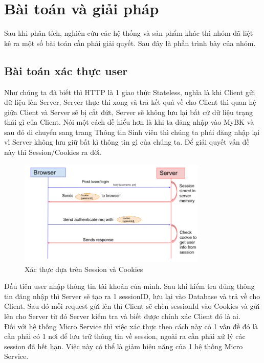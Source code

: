 \chapter{Bài toán và giải pháp}\label{chap:ProblemAndSolve}
		Sau khi phân tích, nghiên cứu các hệ thống và sản phẩm khác thì nhóm đã liệt kê ra một số bài toán cần phải giải quyết. Sau đây là phần trình bày của nhóm.
		
		\section{Bài toán xác thực user}
		Như chúng ta đã biết thì HTTP là 1 giao thức Stateless, nghĩa là khi Client gửi dữ liệu lên Server, Server thực thi xong và trả kết quả về cho Client thì quan hệ giữa Client và Server sẽ bị cắt đứt, Server sẽ không lưu lại bất cứ dữ liệu trạng thái gì của Client. Nói một cách dễ hiểu hơn là khi ta đăng nhập vào MyBK và sau đó di chuyển sang trang Thông tin Sinh viên thì chúng ta phải đăng nhập lại vì Server không lưu giữ bất kì thông tin gì của chúng ta. Để giải quyết vấn đề này thì Session/Cookies ra đời.
	
		\begin{figure}[H]
			\includegraphics[width=0.8\textwidth]{Images/session-cookies.png}
			\centering
			\linebreak
			\caption{Xác thực dựa trên Session và Cookies}
		\end{figure}
		
		Đầu tiên user nhập thông tin tài khoản của mình. Sau khi kiểm tra đúng thông tin đăng nhập thì Server sẽ tạo ra 1 sessionID, lưu lại vào Database và trả về cho Client. Sau đó mỗi request gửi lên thì Client sẽ chèn sessionId vào Cookies và gửi lên cho Server từ đó Server kiểm tra và biết được chính xác Client đó là ai.\\
		
		Đối với hệ thống Micro Service thì việc xác thực theo cách này có 1 vấn đề đó là cần phải có 1 nơi để lưu trữ thông tin về session, ngoài ra cần phải xử lý các session đã hết hạn. Việc này có thể là giảm hiệu năng của 1 hệ thống Micro Service.\\
		
